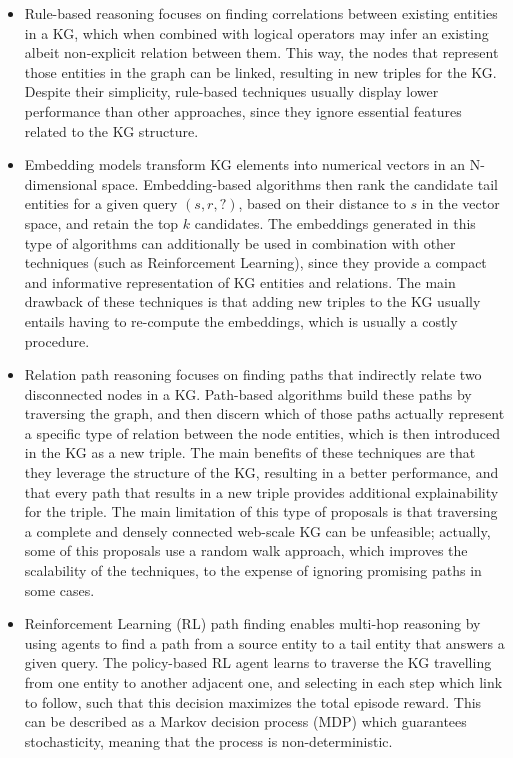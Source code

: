 \begin{itemize}
    \item Rule-based reasoning \cite{galarraga2015, kolthoff2015, BorregoAHR019} focuses on finding correlations between existing entities in a KG, which when combined with logical operators may infer an existing albeit non-explicit relation between them. This way, the nodes that represent those entities in the graph can be linked, resulting in new triples for the KG. Despite their simplicity, rule-based techniques usually display lower performance than other approaches, since they ignore essential features related to the KG structure.
    
    \item Embedding models \cite{dai2020survey} transform KG elements into numerical vectors in an N-dimensional space. Embedding-based algorithms then rank the candidate tail entities for a given query \textit{$(s, r, ?)$}, based on their distance to $s$ in the vector space, and retain the top $k$ candidates. The  embeddings generated in this type of algorithms can additionally be used in combination with other techniques (such as Reinforcement Learning), since they provide a compact and informative representation of KG entities and relations. The main drawback of these techniques is that adding new triples to the KG usually entails having to re-compute the embeddings, which is usually a costly procedure.
    
    \item Relation path reasoning \cite{gardner2015, mazumder2017, BorregoAHRR21} focuses on finding paths that indirectly relate two disconnected nodes in a KG. Path-based algorithms build these paths by traversing the graph, and then discern which of those paths actually represent a specific type of relation between the node entities, which is then introduced in the KG as a new triple. The main benefits of these techniques are that they leverage the structure of the KG, resulting in a better performance, and that every path that results in a new triple provides additional explainability for the triple. The main limitation of this type of proposals is that traversing a complete and densely connected web-scale KG can be unfeasible; actually, some of this proposals use a random walk approach, which improves the scalability of the techniques, to the expense of ignoring promising paths in some cases. 
    
    \item Reinforcement Learning (RL) \cite{xiong2017deeppath} path finding enables multi-hop reasoning by using agents to find a path from a source entity to a tail entity that answers a given query.
    The policy-based RL agent learns to traverse the KG travelling from one entity to another adjacent one, and selecting in each step which link to follow, such that this decision maximizes the total episode reward.
    This can be described as a Markov decision process (MDP) which guarantees stochasticity, meaning that the process is non-deterministic. 
\end{itemize}

